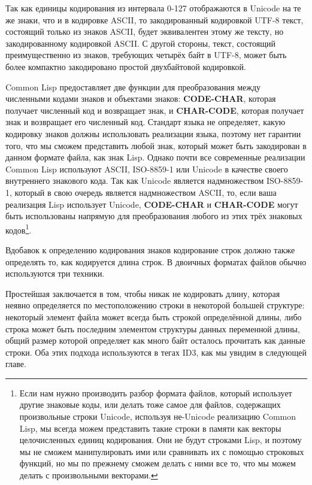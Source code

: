 Так как единицы кодирования из интервала 0-127 отображаются в Unicode на те же знаки, что
и в кодировке ASCII, то закодированный кодировкой UTF-8 текст, состоящий только из знаков
ASCII, будет эквивалентен этому же тексту, но закодированному кодировкой ASCII. С другой
стороны, текст, состоящий преимущественно из знаков, требующих четырёх байт в UTF-8, может
быть более компактно закодировано простой двухбайтовой кодировкой.

Common Lisp предоставляет две функции для преобразования между численными кодами знаков и
объектами знаков: \textbf{CODE-CHAR}, которая получает численный код и возвращает знак, и
\textbf{CHAR-CODE}, которая получает знак и возвращает его численный код. Стандарт языка
не определяет, какую кодировку знаков должны использовать реализации языка, поэтому нет
гарантии того, что мы сможем представить любой знак, который может быть закодирован в
данном формате файла, как знак Lisp. Однако почти все современные реализации Common Lisp
используют ASCII, ISO-8859-1 или Unicode в качестве своего внутреннего знакового кода. Так
как Unicode является надмножеством ISO-8859-1, который в свою очередь является
надмножеством ASCII, то, если ваша реализация Lisp использует Unicode, \textbf{CODE-CHAR}
и \textbf{CHAR-CODE} могут быть использованы напрямую для преобразования любого из этих
трёх знаковых кодов\footnote{Если нам нужно производить разбор формата файлов, который
  использует другие знаковые коды, или делать тоже самое для файлов, содержащих
  произвольные строки Unicode, используя не-Unicode реализацию Common Lisp, мы всегда
  можем представить такие строки в памяти как векторы целочисленных единиц
  кодирования. Они не будут строками Lisp, и поэтому мы не сможем манипулировать ими или
  сравнивать их с помощью строковых функций, но мы по прежнему сможем делать с ними все
  то, что мы можем делать с произвольными векторами.}.

Вдобавок к определению кодирования знаков кодирование строк должно также определять то,
как кодируется длина строк. В двоичных форматах файлов обычно используются три техники.

Простейшая заключается в том, чтобы никак не кодировать длину, которая неявно определяется
по местоположению строки в некоторой большей структуре: некоторый элемент файла может
всегда быть строкой определённой длины, либо строка может быть последним элементом
структуры данных переменной длины, общий размер которой определяет как много байт осталось
прочитать как данные строки. Оба этих подхода используются в тегах ID3, как мы увидим в
следующей главе.

